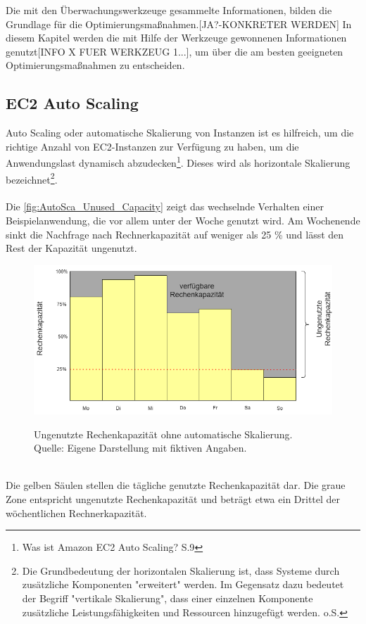 Die mit den Überwachungswerkzeuge gesammelte Informationen, bilden die Grundlage für die Optimierungsmaßnahmen.[JA?-KONKRETER WERDEN]
In diesem Kapitel werden die mit Hilfe der Werkzeuge gewonnenen Informationen genutzt[INFO X FUER WERKZEUG 1...], um über die am besten geeigneten Optimierungsmaßnahmen zu entscheiden.

\subsection{EC2 Auto Scaling}
Auto Scaling oder automatische Skalierung von Instanzen ist es hilfreich, um die richtige Anzahl von EC2-Instanzen zur Verfügung zu haben, um die Anwendungslast dynamisch abzudecken\footnote{Was ist Amazon EC2 Auto Scaling? S.9\cite{AMZ31} }. Dieses wird als horizontale Skalierung bezeichnet\footnote{Die Grundbedeutung der horizontalen Skalierung ist, dass Systeme durch zusätzliche Komponenten "erweitert" werden. Im Gegensatz dazu bedeutet der Begriff "vertikale Skalierung", dass einer einzelnen Komponente zusätzliche Leistungsfähigkeiten und Ressourcen hinzugefügt werden. o.S.\cite{TECH1} }.
\\\\
Die \autoref{fig:AutoSca_Unused_Capacity} zeigt das wechselnde Verhalten einer Beispielanwendung, die vor allem unter der Woche genutzt wird. Am Wochenende sinkt die Nachfrage nach Rechnerkapazität auf weniger als 25 \% und lässt den Rest der Kapazität ungenutzt. 
\begin{figure}[h]
    \centering
    \includegraphics[scale=0.5]{sources/AutoCap Unused Capacity}
    \caption[Ungenutzte Rechenkapazität ohne automatische Skalierung]{}
    \label{fig:AutoSca_Unused_Capacity} Ungenutzte Rechenkapazität ohne automatische Skalierung. \\
    Quelle: Eigene Darstellung mit fiktiven Angaben. 
  \end{figure}\\
Die gelben Säulen stellen die tägliche genutzte Rechenkapazität dar.
Die graue Zone entspricht ungenutzte Rechenkapazität und beträgt etwa ein Drittel der wöchentlichen Rechnerkapazität.
